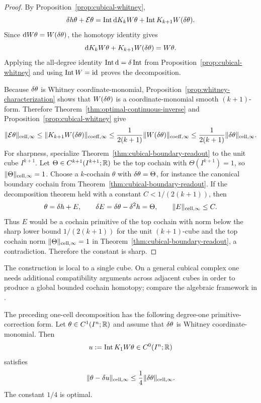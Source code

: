 \begin{proof}
By Proposition~\ref{prop:cubical-whitney},
\[
\delta h\theta+\mathcal E\theta
=
\operatorname{Int}\mathrm{d} K_kW\theta+\operatorname{Int} K_{k+1}W(\delta\theta).
\]
Since $\mathrm{d} W\theta=W(\delta\theta)$, the homotopy identity gives
\[
\mathrm{d} K_kW\theta+K_{k+1}W(\delta\theta)=W\theta.
\]
Applying the all-degree identity $\operatorname{Int}\mathrm{d}=\delta\operatorname{Int}$ from
Proposition~\ref{prop:cubical-whitney} and using $\operatorname{Int} W=\mathrm{id}$ proves the
decomposition.

Because $\delta\theta$ is Whitney coordinate-monomial,
Proposition~\ref{prop:whitney-characterization} shows that $W(\delta\theta)$ is a
coordinate-monomial smooth $(k+1)$-form. Therefore
Theorem~\ref{thm:optimal-continuous-inverse} and
Proposition~\ref{prop:cubical-whitney} give
\[
\lVert \mathcal E\theta \rVert_{\mathrm{cell},\infty}
\le
\lVert K_{k+1}W(\delta\theta) \rVert_{\mathrm{coeff},\infty}
\le
\frac{1}{2(k+1)}\lVert W(\delta\theta) \rVert_{\mathrm{coeff},\infty}
\le
\frac{1}{2(k+1)}\lVert \delta\theta \rVert_{\mathrm{cell},\infty}.
\]
For sharpness, specialize Theorem~\ref{thm:cubical-boundary-readout} to the
unit cube $I^{k+1}$. Let $\Theta\in C^{k+1}(I^{k+1};\mathbb{R})$ be the top cochain
with $\Theta(I^{k+1})=1$, so $\lVert \Theta \rVert_{\mathrm{cell},\infty}=1$. Choose a
$k$-cochain $\theta$ with $\delta\theta=\Theta$, for instance the canonical
boundary cochain from Theorem~\ref{thm:cubical-boundary-readout}. If the
decomposition theorem held with a constant $C<1/(2(k+1))$, then
\[
\theta=\delta h+E,\qquad \delta E=\delta\theta-\delta^2h=\Theta,\qquad
\lVert E \rVert_{\mathrm{cell},\infty}\le C.
\]
Thus $E$ would be a cochain primitive of the top cochain with norm below the
sharp lower bound $1/(2(k+1))$ for the unit $(k+1)$-cube and the top cochain
norm $\lVert \Theta \rVert_{\mathrm{cell},\infty}=1$ in
Theorem~\ref{thm:cubical-boundary-readout}, a contradiction. Therefore the
constant is sharp.
\end{proof}

\begin{remark}
The construction is local to a single cube. On a general cubical complex one
needs additional compatibility arguments across adjacent cubes in order to
produce a global bounded cochain homotopy; compare the algebraic framework in
\cite{Dupont1976,DupontBook1978,Albert2020}.
\end{remark}

\begin{corollary}
\label{cor:hypercube-gradient}
The preceding one-cell decomposition has the following degree-one
primitive-correction form. Let $\theta\in C^1(I^n;\mathbb{R})$ and assume that
$\delta\theta$ is Whitney coordinate-monomial. Then
\[
\displaystyle u:=\operatorname{Int} K_1W\theta\in C^0(I^n;\mathbb{R})
\]
satisfies
\[
\lVert \theta-\delta u \rVert_{\mathrm{cell},\infty}
\le
\frac14\lVert \delta\theta \rVert_{\mathrm{cell},\infty}.
\]
The constant $1/4$ is optimal.
\end{corollary}

